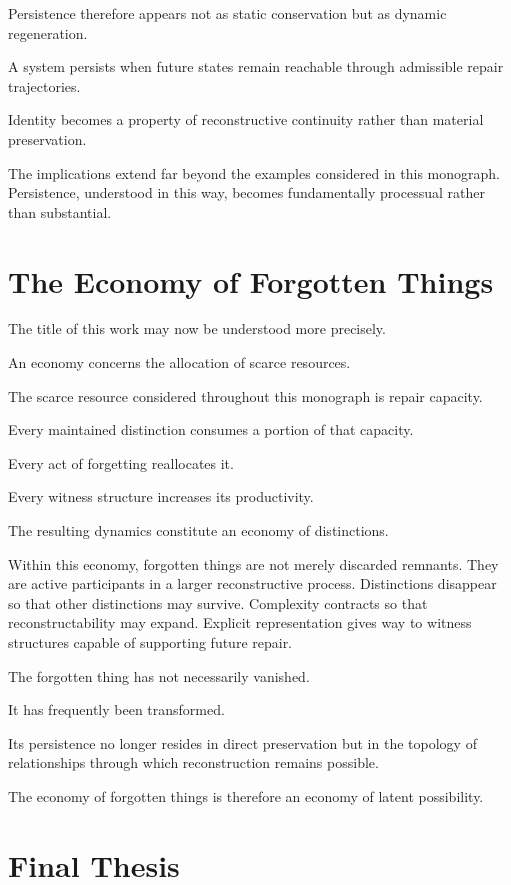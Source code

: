 \documentclass[12pt,oneside]{book}
\theoremstyle{plain} \newtheorem{theorem}{Theorem}[chapter] \newtheorem{lemma}[theorem]{Lemma} \newtheorem{proposition}[theorem]{Proposition} \newtheorem{corollary}[theorem]{Corollary}
\theoremstyle{definition} \newtheorem{definition}[theorem]{Definition} \newtheorem{axiom}[theorem]{Axiom} \newtheorem{construction}[theorem]{Construction}
\theoremstyle{remark} \newtheorem{remark}[theorem]{Remark} \newtheorem{example}[theorem]{Example}
\begin{document}
Persistence therefore appears not as static conservation but as dynamic regeneration.

A system persists when future states remain reachable through admissible repair trajectories.

Identity becomes a property of reconstructive continuity rather than material preservation.

The implications extend far beyond the examples considered in this monograph. Persistence, understood in this way, becomes fundamentally processual rather than substantial.

\section{The Economy of Forgotten Things}

The title of this work may now be understood more precisely.

An economy concerns the allocation of scarce resources.

The scarce resource considered throughout this monograph is repair capacity.

Every maintained distinction consumes a portion of that capacity.

Every act of forgetting reallocates it.

Every witness structure increases its productivity.

The resulting dynamics constitute an economy of distinctions.

Within this economy, forgotten things are not merely discarded remnants. They are active participants in a larger reconstructive process. Distinctions disappear so that other distinctions may survive. Complexity contracts so that reconstructability may expand. Explicit representation gives way to witness structures capable of supporting future repair.

The forgotten thing has not necessarily vanished.

It has frequently been transformed.

Its persistence no longer resides in direct preservation but in the topology of relationships through which reconstruction remains possible.

The economy of forgotten things is therefore an economy of latent possibility.

\section{Final Thesis}
\end{document}
